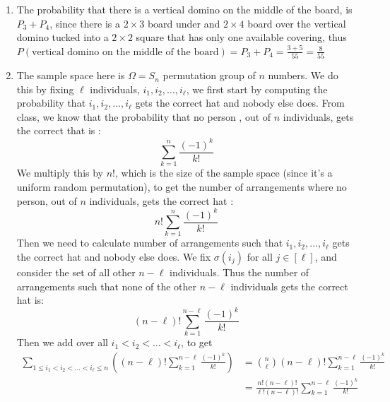 \documentclass[12pt]{article}
\begin{document}
\begin{enumerate}
\begin{align*}
					 P_1 &= 1 \\
					 P_2 &= 2 \\
					 P_3 &= 3 \\
					 P_4 &= 5 \\
					 P_5 &= 8 \\
					 P_6 &= 13 \\
					 P_7 &= 21 \\
					 P_8 &= 34 \\
					 P_9 &= 55
				 \end{align*}
				 Thus $P(\text{every domino is placed vertically}) = \frac{1}{55}$
				 \pagebreak
			 \item The probability that there is a vertical domino on the middle of the board, is $P_3 + P_4$, since there is a $2\times3$ board under and $2 \times 4$ board over the vertical domino tucked into a $2\times2$ square that has only one available covering, thus $P(\text{vertical domino on the middle of the board}) = P_3 + P_4 = \frac{3+5}{55} = \frac{8}{55}$
				 \pagebreak
			 \item 
				 The sample space here is $\Omega = S_n$ permutation group of $n$ numbers. We do this by fixing $\ell$ individuals, $i_1, i_2, \ldots, i_\ell$,  we first start by computing the probability that $i_1, i_2, \ldots, i_\ell$ gets the correct hat and nobody else does. From class, we know that the probability that no person , out of $n$ individuals, gets the correct that is : 
				 \[
					\sum_{k=1}^n \frac{ (-1)^k}{k!}
				 \]
				 We multiply this by $n!$, which is the size of the sample space (since it's a uniform random permutation), to get the number of arrangements where no person, out of $n$ individuals, gets the correct hat : 
				 \[
					n! \sum_{k=1}^n \frac{(-1)^k}{k!}
				 \]
				 Then we need to calculate number of arrangements such that $i_1, i_2, \ldots, i_\ell$ gets the correct hat and nobody else does. We fix $\sigma(i_j)$ for all $j \in [\ell]$, and consider the set of all other $n-\ell$ individuals. Thus the number of arrangements such that none of the other $n- \ell$ individuals gets the correct hat is:
				 \[
					(n-\ell)! \sum_{k=1}^{n - \ell} \frac{(-1)^k}{k!}
				 \]
				 Then we add over all $i_1 < i_2 < \ldots < i_\ell$, to get 
				 \begin{align*}
					 \sum_{1 \leq i_1 < i_2< \ldots < i_\ell \leq n}\left( (n-\ell)! \sum_{k=1}^{n - \ell} \frac{(-1)^k}{k!}\right) &= \binom{n}{\ell} (n-\ell)! \sum_{k=1}^{n - \ell} \frac{(-1)^k}{k!} \\
																	   &= \frac{n! (n-\ell)!}{\ell ! (n-\ell)!} \sum_{k=1}^{n - \ell} \frac{(-1)^k}{k!} \\

\end{align*}
\end{enumerate}
\end{document}
